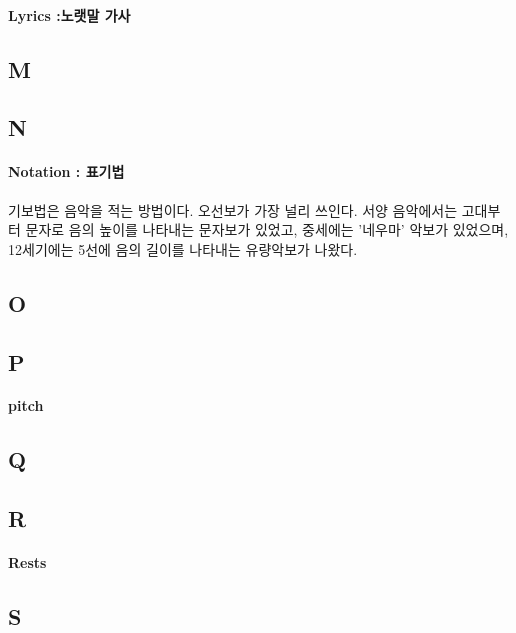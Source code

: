 \documentclass[12pt, a4paper, oneside]{book}
\begin{document}
\paragraph{Lyrics :노랫말 가사}



	\subsection{M}


	\subsection{N}

\paragraph{Notation : 표기법}

기보법은 음악을 적는 방법이다. 오선보가 가장 널리 쓰인다. 
서양 음악에서는 고대부터 문자로 음의 높이를 나타내는 문자보가 있었고, 중세에는 '네우마' 악보가 있었으며, 12세기에는 5선에 음의 길이를 나타내는 유량악보가 나왔다.


	\subsection{O}

	\subsection{P}


	\paragraph{pitch}


	\subsection{Q}

	\subsection{R}


\paragraph{Rests}

	\subsection{S}
\end{document}
